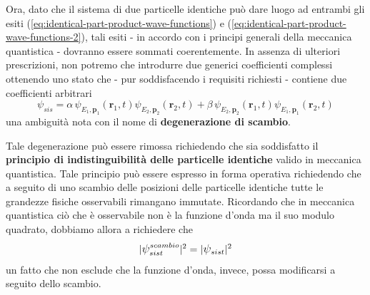 Ora, dato che il sistema di due particelle identiche può dare luogo
ad entrambi gli esiti (\ref{eq:identical-part-product-wave-functions}) e (\ref{eq:identical-part-product-wave-functions-2}),
tali esiti - in accordo con
i principi generali della meccanica quantistica - dovranno essere
sommati coerentemente.
In assenza di ulteriori prescrizioni, non potremo
che introdurre due generici coefficienti complessi ottenendo uno stato
che - pur soddisfacendo i requisiti richiesti - contiene due
coefficienti arbitrari
\[
	\psi_{sis} = \alpha \, \psi_{E_{1},\bm{p}_{1}}(\bm{r}_{1},t) \psi_{E_{2},\bm{p}_{2}}(\bm{r}_{2},t) +
	\beta \, \psi_{E_{2},\bm{p}_{2}}(\bm{r}_{1},t) \psi_{E_{1},\bm{p}_{1}}(\bm{r}_{2},t)
\]
una ambiguità nota con il nome di \textbf{degenerazione di scambio}.
\bigskip

Tale degenerazione può essere rimossa richiedendo che sia soddisfatto il \textbf{principio di indistinguibilità delle particelle
identiche} valido in meccanica quantistica.
Tale principio può essere espresso in forma operativa richiedendo che a seguito di uno scambio delle posizioni delle particelle identiche tutte le grandezze fisiche osservabili rimangano immutate.
Ricordando che in meccanica quantistica ciò che è osservabile non è la funzione d’onda ma il suo modulo quadrato, dobbiamo allora a richiedere che
\begin{equation}
	|\mathlarger{\psi}_{sist}^{scambio}|^2 = |\mathlarger{\psi}_{sist}|^2
	\label{eq:indistinguishable-particles-principle}
\end{equation}
un fatto che non esclude che la funzione d’onda, invece, possa modificarsi a seguito dello scambio.
\bigskip

